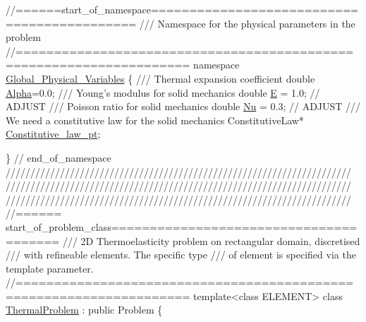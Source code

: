 \begin{DoxyCodeInclude}
\textcolor{comment}{//======start\_of\_namespace============================================}\textcolor{comment}{}
\textcolor{comment}{/// Namespace for the physical parameters in the problem}
\textcolor{comment}{}\textcolor{comment}{//====================================================================}
\textcolor{keyword}{namespace }\hyperlink{namespaceGlobal__Physical__Variables}{Global\_Physical\_Variables}
\{\textcolor{comment}{}
\textcolor{comment}{ /// Thermal expansion coefficient }
\textcolor{comment}{} \textcolor{keywordtype}{double} \hyperlink{namespaceGlobal__Physical__Variables_aa2e802ee7cc8e1ac900ba94c3ce86eb7}{Alpha}=0.0;
 \textcolor{comment}{}
\textcolor{comment}{ /// Young's modulus for solid mechanics}
\textcolor{comment}{} \textcolor{keywordtype}{double} \hyperlink{namespaceGlobal__Physical__Variables_a09a019474b7405b35da2437f7779bc7e}{E} = 1.0; \textcolor{comment}{// ADJUST }
\textcolor{comment}{}
\textcolor{comment}{ /// Poisson ratio for solid mechanics}
\textcolor{comment}{} \textcolor{keywordtype}{double} \hyperlink{namespaceGlobal__Physical__Variables_a3962c36313826b19f216f6bbbdd6a477}{Nu} = 0.3; \textcolor{comment}{// ADJUST}
\textcolor{comment}{}
\textcolor{comment}{ /// We need a constitutive law for the solid mechanics}
\textcolor{comment}{} ConstitutiveLaw* \hyperlink{namespaceGlobal__Physical__Variables_a2a37fb040c832ee7a086bb13bb02a100}{Constitutive\_law\_pt};

\} \textcolor{comment}{// end\_of\_namespace}
\textcolor{comment}{}
\textcolor{comment}{//////////////////////////////////////////////////////////////////////}
\textcolor{comment}{//////////////////////////////////////////////////////////////////////}
\textcolor{comment}{//////////////////////////////////////////////////////////////////////}
\textcolor{comment}{}
\textcolor{comment}{//====== start\_of\_problem\_class=======================================}\textcolor{comment}{}
\textcolor{comment}{/// 2D Thermoelasticity problem on rectangular domain, discretised }
\textcolor{comment}{/// with refineable elements. The specific type}
\textcolor{comment}{/// of element is specified via the template parameter.}
\textcolor{comment}{}\textcolor{comment}{//====================================================================}
\textcolor{keyword}{template}<\textcolor{keyword}{class} ELEMENT> 
\textcolor{keyword}{class }\hyperlink{classThermalProblem}{ThermalProblem} : \textcolor{keyword}{public} Problem
\{


\end{DoxyCodeInclude}
